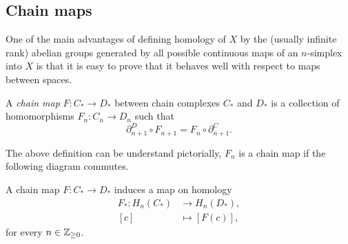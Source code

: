 \subsection{Chain maps}

One of the main advantages of defining homology of $X$ by the (usually infinite rank) abelian groups generated by all possible continuous maps of an $n$-simplex into $X$ is that it is easy to prove that it behaves well with respect to maps between spaces.

\begin{definition}
	A \emph{chain map} $F: C_* \to D_*$ between chain complexes $C_*$ and $D_*$ is a collection of homomorphisms $F_n: C_n \to D_n$ such that
	\[
		\partial_{n+1}^D \circ F_{n+1} = F_n \circ \partial_{n+1}^C.
	\]
\end{definition}

The above definition can be understand pictorially, $F_n$ is a chain map if the following diagram commutes.

\begin{center}
\end{center}

\begin{lemma}
	A chain map $F: C_* \to D_*$ induces a map on homology
	\begin{align*}
		F_* : H_n(C_*) & \to H_n(D_*),   \\
		[c]            & \mapsto [F(c)],
	\end{align*}
	for every $n \in \mathbb{Z}_{\geq 0}$.
\end{lemma}


